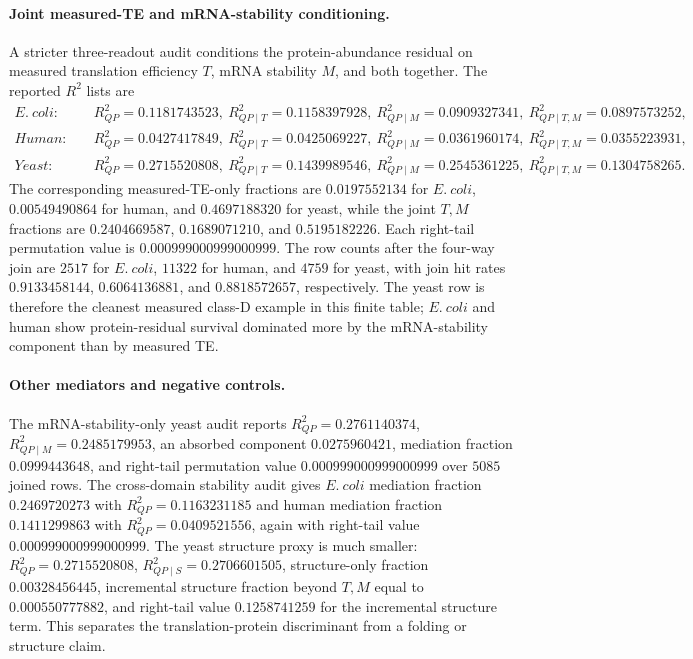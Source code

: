 \paragraph{Joint measured-TE and mRNA-stability conditioning.}
A stricter three-readout audit conditions the protein-abundance residual on measured translation efficiency $T$, mRNA stability $M$, and both together. The reported $R^2$ lists are
$$
\begin{aligned}
E.\ coli:\quad &R^2_{QP}=0.1181743523,\ R^2_{QP\mid T}=0.1158397928,\ R^2_{QP\mid M}=0.0909327341,\ R^2_{QP\mid T,M}=0.0897573252,\\
Human:\quad &R^2_{QP}=0.0427417849,\ R^2_{QP\mid T}=0.0425069227,\ R^2_{QP\mid M}=0.0361960174,\ R^2_{QP\mid T,M}=0.0355223931,\\
Yeast:\quad &R^2_{QP}=0.2715520808,\ R^2_{QP\mid T}=0.1439989546,\ R^2_{QP\mid M}=0.2545361225,\ R^2_{QP\mid T,M}=0.1304758265.
\end{aligned}
$$
The corresponding measured-TE-only fractions are $0.0197552134$ for $E.\ coli$, $0.00549490864$ for human, and $0.4697188320$ for yeast, while the joint $T,M$ fractions are $0.2404669587$, $0.1689071210$, and $0.5195182226$. Each right-tail permutation value is $0.000999000999000999$. The row counts after the four-way join are $2517$ for $E.\ coli$, $11322$ for human, and $4759$ for yeast, with join hit rates $0.9133458144$, $0.6064136881$, and $0.8818572657$, respectively. The yeast row is therefore the cleanest measured class-D example in this finite table; $E.\ coli$ and human show protein-residual survival dominated more by the mRNA-stability component than by measured TE.

\paragraph{Other mediators and negative controls.}
The mRNA-stability-only yeast audit reports $R^2_{QP}=0.2761140374$, $R^2_{QP\mid M}=0.2485179953$, an absorbed component $0.0275960421$, mediation fraction $0.0999443648$, and right-tail permutation value $0.000999000999000999$ over $5085$ joined rows. The cross-domain stability audit gives $E.\ coli$ mediation fraction $0.2469720273$ with $R^2_{QP}=0.1163231185$ and human mediation fraction $0.1411299863$ with $R^2_{QP}=0.0409521556$, again with right-tail value $0.000999000999000999$. The yeast structure proxy is much smaller: $R^2_{QP}=0.2715520808$, $R^2_{QP\mid S}=0.2706601505$, structure-only fraction $0.00328456445$, incremental structure fraction beyond $T,M$ equal to $0.000550777882$, and right-tail value $0.1258741259$ for the incremental structure term. This separates the translation-protein discriminant from a folding or structure claim.

